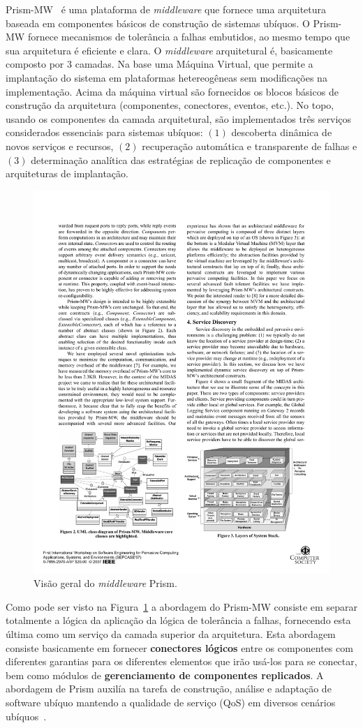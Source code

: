 Prism-MW~\cite{Seo07} é uma plataforma de \emph{middleware} que fornece uma arquitetura baseada em componentes básicos de construção de sistemas ubíquos. O Prism-MW fornece mecanismos de tolerância a falhas embutidos, ao mesmo tempo que sua arquitetura é eficiente e clara. O \emph{middleware} arquitetural é, basicamente composto por 3 camadas. Na base uma Máquina Virtual, que permite a implantação do sistema em plataformas hetereogêneas sem modificações na implementação. Acima da máquina virtual são fornecidos os blocos básicos de construção da arquitetura (componentes, conectores, eventos, etc.). No topo, usando os componentes da camada arquitetural, são implementados três serviços considerados essenciais para sistemas ubíquos: $(1)$ descoberta dinâmica de novos serviços e recursos, $(2)$ recuperação automática e transparente de falhas e $(3)$ determinação analítica das estratégias de replicação de componentes e arquiteturas de implantação.

\begin{figure}[htbp]
	\centering
		\includegraphics[width=.7\textwidth]{figuras/prism.pdf}
	\caption{Visão geral do \emph{middleware} Prism.}
	\label{fig:prism}
\end{figure}

Como pode ser visto na Figura~\ref{fig:prism} a abordagem do Prism-MW consiste em separar totalmente a lógica da aplicação da lógica de tolerância a falhas, fornecendo esta última como um serviço da camada superior da arquitetura. Esta abordagem consiste basicamente em fornecer \textbf{conectores lógicos} entre os componentes com diferentes garantias para os diferentes elementos que irão usá-los para se conectar, bem como módulos de \textbf{gerenciamento de componentes replicados}. A abordagem de Prism auxilía na tarefa de construção, análise e adaptação de software ubíquo mantendo a qualidade de serviço (QoS) em diversos cenários ubíquos~\cite{Seo07}.

